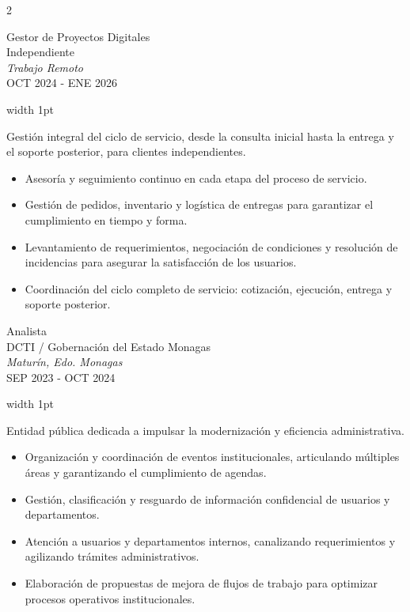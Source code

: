 \documentclass[9pt, a4paper]{article}
\newcommand{\CVExpMeta}[4]{
    {\noindent
    {\PlexMedium\color{CVPrimary} #1} \\
    {\PlexSans #2} \\
    {\PlexLight\itshape #3} \\
    {\PlexExtraLight #4}}
    \vspace{0.5cm}
}
\newcommand{\CVExpBody}[1]{
    \noindent
    \textcolor{CVLine}{\vrule width 1pt} \hspace{1cm}
    \begin{minipage}[t]{0.92\linewidth}
        \raggedright {\DMSansLight #1}
    \end{minipage}
    \vspace{0.5cm}
}
\begin{document}
\setlength{\columnsep}{1.6cm}
\begin{paracol}{2}

\CVExpMeta{Gestor de Proyectos Digitales}
{Independiente}
{Trabajo Remoto}
{OCT 2024 - ENE 2026}
\switchcolumn
\CVExpBody{
Gestión integral del ciclo de servicio, desde la consulta inicial hasta la entrega y el soporte posterior, para clientes independientes.
\begin{itemize}[label=\textcolor{CVBullet}{–}, leftmargin=0.5cm, topsep=0.4cm, itemsep=0.15cm]
    \item Asesoría y seguimiento continuo en cada etapa del proceso de servicio.
    \item Gestión de pedidos, inventario y logística de entregas para garantizar el cumplimiento en tiempo y forma.
    \item Levantamiento de requerimientos, negociación de condiciones y resolución de incidencias para asegurar la satisfacción de los usuarios.
    \item Coordinación del ciclo completo de servicio: cotización, ejecución, entrega y soporte posterior.
\end{itemize}
}
\switchcolumn*

\CVExpMeta{Analista}
{DCTI / Gobernación del Estado Monagas}
{Maturín, Edo. Monagas}
{SEP 2023 - OCT 2024}
\switchcolumn
\CVExpBody{
Entidad pública dedicada a impulsar la modernización y eficiencia administrativa.
\begin{itemize}[label=\textcolor{CVBullet}{–}, leftmargin=0.5cm, topsep=0.4cm, itemsep=0.15cm]
    \item Organización y coordinación de eventos institucionales, articulando múltiples áreas y garantizando el cumplimiento de agendas.
    \item Gestión, clasificación y resguardo de información confidencial de usuarios y departamentos.
    \item Atención a usuarios y departamentos internos, canalizando requerimientos y agilizando trámites administrativos.
    \item Elaboración de propuestas de mejora de flujos de trabajo para optimizar procesos operativos institucionales.
\end{itemize}
}
\switchcolumn*


\end{paracol}
\end{document}
